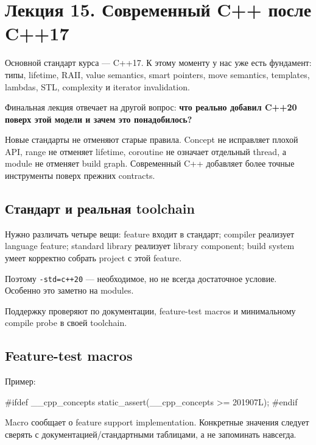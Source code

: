 \section{Лекция 15. Современный C++ после C++17}
\label{sec:lecture-15}

Основной стандарт курса --- C++17. К этому моменту у нас уже есть фундамент:
типы, lifetime, RAII, value semantics, smart pointers, move semantics,
templates, lambdas, STL, complexity и iterator invalidation.

Финальная лекция отвечает на другой вопрос: \textbf{что реально добавил C++20
поверх этой модели и зачем это понадобилось?}

\begin{importantbox}[Итог]
Новые стандарты не отменяют старые правила. Concept не исправляет плохой API,
range не отменяет lifetime, coroutine не означает отдельный thread, а module не
отменяет build graph. Современный C++ добавляет более точные инструменты поверх
прежних contracts.
\end{importantbox}

\subsection{Стандарт и реальная toolchain}

Нужно различать четыре вещи:
feature входит в стандарт; compiler реализует language feature; standard library реализует library component; build system умеет корректно собрать project с этой feature.

Поэтому \texttt{-std=c++20} --- необходимое, но не всегда достаточное условие.
Особенно это заметно на modules.

Поддержку проверяют по документации, feature-test macros и минимальному compile
probe в своей toolchain.

\subsection{Feature-test macros}

Пример:

\begin{cppcode}
#ifdef __cpp_concepts
static_assert(__cpp_concepts >= 201907L);
#endif
\end{cppcode}

Macro сообщает о feature support implementation. Конкретные значения следует
сверять с документацией/стандартными таблицами, а не запоминать навсегда.


